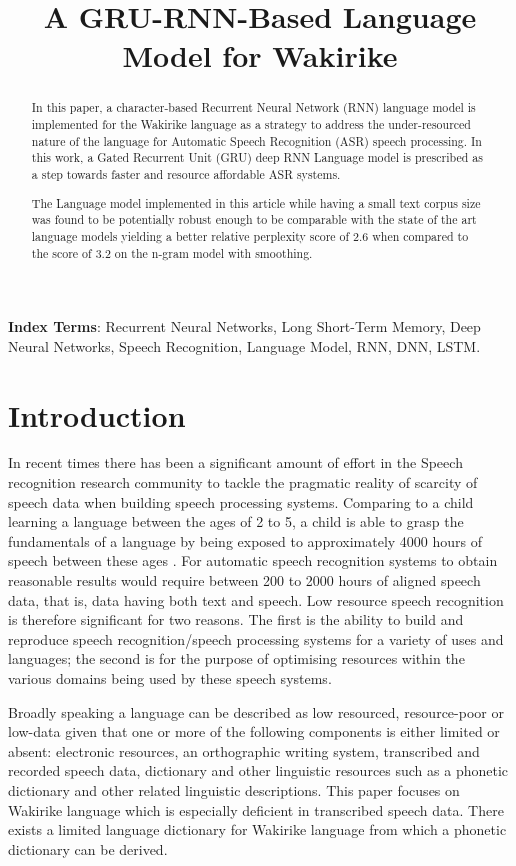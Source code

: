 \documentclass[a4paper]{article}
\title{A GRU-RNN-Based Language Model for Wakirike}
\begin{document}
\maketitle
% 
\begin{abstract}
In this paper, a character-based Recurrent Neural Network (RNN) language model is implemented for the Wakirike language as a strategy to address the under-resourced nature of the language for Automatic Speech Recognition (ASR) speech processing.  In this work, a Gated Recurrent Unit (GRU) deep RNN Language model is prescribed as a step towards faster and resource affordable ASR systems. 

The Language model implemented in this article while having a small text corpus size was found to be potentially robust enough to be comparable with the state of the art language models yielding a better relative perplexity score of 2.6 when compared to the score of 3.2 on the n-gram model with smoothing.
\end{abstract}
\noindent\textbf{Index Terms}: Recurrent Neural Networks, Long Short-Term Memory, Deep Neural Networks, Speech Recognition, Language Model, RNN, DNN, LSTM.

\section{Introduction}

In recent times there has been a significant amount of effort in the Speech recognition research community to tackle the pragmatic reality of scarcity of speech data when building speech processing systems.  Comparing to a child learning a language between the ages of 2 to 5, a child is able to grasp the fundamentals of a language by being exposed to approximately 4000 hours of speech between these ages \cite{versteegh2015zero}.  For automatic speech recognition systems to obtain reasonable results would require between 200 to 2000 hours of aligned speech data, that is, data having both text and speech\cite{hannun2014deep}.  Low resource speech recognition is therefore significant for two reasons. The first is the ability to build and reproduce speech recognition/speech processing systems for a variety of uses and languages; the second is for the purpose of optimising resources within the various domains being used by these speech systems.

Broadly speaking a language can be described as low resourced, resource-poor or low-data \cite{besacier2014automatic} given that one or more of the following components is either limited or absent: electronic resources, an orthographic writing system, transcribed and recorded speech data, dictionary and other linguistic resources such as a phonetic dictionary and other related linguistic descriptions. This paper focuses on Wakirike language which is especially deficient in transcribed speech data.  There exists a limited language dictionary for Wakirike language from which a phonetic dictionary can be derived.
\end{document}
